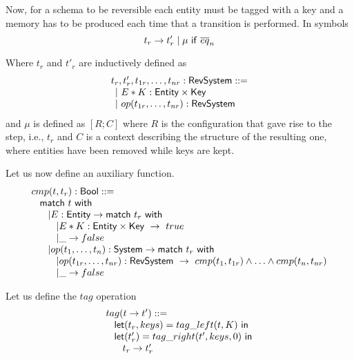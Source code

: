 \documentclass{article}[12pt,a4paper]
\theoremstyle{definition}
\newcommand{\paral}{\;|\;}
\begin{document}
Now, for a schema to be reversible each entity must be tagged with a key and a
memory has to be produced each time that a transition is performed. In symbols
\[t_r \rightarrow t'_r \paral \mu ~\ms{if}~\overline{eq}_n\]

Where $t_r$ and $t'_r$ are inductively defined as
\[
  \begin{array}{l}
    t_r,t'_r,t_{1r},\ldots,t_{nr}: \mathsf{RevSystem} ::=\\
    \hspace{1ex}|~E*K: \mathsf{Entity} \times \mathsf{Key}\\
    \hspace{1ex}|~op(t_{1r},\ldots,t_{nr}): \mathsf{RevSystem}\\
  \end{array}
\]
and $\mu$ is defined as $[R;C]$ where $R$ is the configuration that gave rise to
the step, i.e., $t_r$ and $C$ is a context describing the structure of the
resulting one, where entities have been removed while keys are kept.

Let us now define an auxiliary function.
\[
  \begin{array}{l}
  cmp(t,t_r):\mathsf{Bool} ::=\\
    \hspace{2ex}\mathsf{match}~t~\mathsf{with}\\
    \hspace{4ex}| E: \mathsf{Entity} \rightarrow \mathsf{match}~t_r~\mathsf{with}\\
    \hspace{6ex}| E*K: \mathsf{Entity}\times\mathsf{Key}~\rightarrow~true\\
    \hspace{6ex}| \_ \rightarrow false\\
    \hspace{4ex}| op(t_1,\ldots,t_n): \mathsf{System} \rightarrow \mathsf{match}~t_r~\mathsf{with}\\
    \hspace{6ex}| op(t_{1r},\ldots,t_{nr}):
    \mathsf{RevSystem}~\rightarrow~cmp(t_1,t_{1r}) \wedge\ldots\wedge cmp(t_n,t_{nr})\\
    \hspace{6ex}| \_ \rightarrow false

  \end{array}
\]

Let us define the $tag$ operation
\[
  \begin{array}{l}
    tag(t\rightarrow t') ::=\\
    \hspace{2ex}\mathsf{let} (t_r, keys) = tag\_left(t, K)~\mathsf{in}\\
    \hspace{2ex}\mathsf{let} (t_r') = tag\_right(t', keys, 0)~\mathsf{in}\\
    \hspace{4ex}t_r \rightarrow t'_r
  \end{array}
\]
\end{document}
